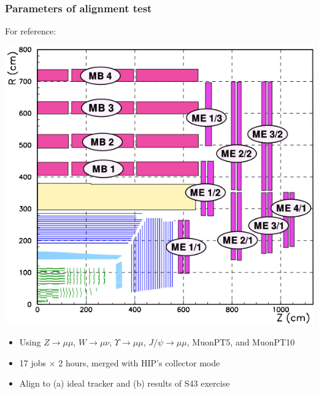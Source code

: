 \documentclass[compress]{beamer}
\begin{document}
\begin{frame}
\frametitle{Parameters of alignment test}

\begin{center}
\begin{minipage}{0.5\linewidth}
For reference:

\includegraphics[width=\linewidth]{muon_system.png}
\end{minipage}
\end{center}

\begin{itemize}
\item Using $Z\to\mu\mu$, $W\to\mu\nu$, $\Upsilon\to\mu\mu$, $J/\psi\to\mu\mu$, MuonPT5, and MuonPT10
\item 17 jobs $\times$ 2 hours, merged with HIP's collector mode
\item Align to (a) ideal tracker and (b) results of S43 exercise
\end{itemize}
\end{frame}
\end{document}
